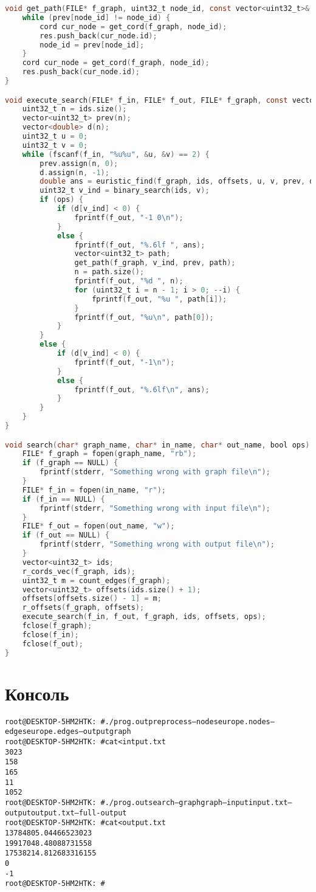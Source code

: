 \begin{lstlisting}[language=C]
void get_path(FILE* f_graph, uint32_t node_id, const vector<uint32_t>& prev, vector<uint32_t>& res) {
    while (prev[node_id] != node_id) {
        cord cur_node = get_cord(f_graph, node_id);
        res.push_back(cur_node.id);
        node_id = prev[node_id];
    }
    cord cur_node = get_cord(f_graph, node_id);
    res.push_back(cur_node.id);
}

void execute_search(FILE* f_in, FILE* f_out, FILE* f_graph, const vector<uint32_t>& ids, const vector<uint32_t>& offsets, bool ops) {
    uint32_t n = ids.size();
    vector<uint32_t> prev(n);
    vector<double> d(n);
    uint32_t u = 0;
    uint32_t v = 0;
    while (fscanf(f_in, "%u%u", &u, &v) == 2) {
        prev.assign(n, 0);
        d.assign(n, -1);
        double ans = euristic_find(f_graph, ids, offsets, u, v, prev, d);
        uint32_t v_ind = binary_search(ids, v);
        if (ops) {
            if (d[v_ind] < 0) {
                fprintf(f_out, "-1 0\n");
            }
            else {
                fprintf(f_out, "%.6lf ", ans);
                vector<uint32_t> path;
                get_path(f_graph, v_ind, prev, path);
                n = path.size();
                fprintf(f_out, "%d ", n);
                for (uint32_t i = n - 1; i > 0; --i) {
                    fprintf(f_out, "%u ", path[i]);
                }
                fprintf(f_out, "%u\n", path[0]);
            }
        }
        else {
            if (d[v_ind] < 0) {
                fprintf(f_out, "-1\n");
            }
            else {
                fprintf(f_out, "%.6lf\n", ans);
            }
        }
    }
}

void search(char* graph_name, char* in_name, char* out_name, bool ops) {
    FILE* f_graph = fopen(graph_name, "rb");
    if (f_graph == NULL) {
        fprintf(stderr, "Something wrong with graph file\n");
    }
    FILE* f_in = fopen(in_name, "r");
    if (f_in == NULL) {
        fprintf(stderr, "Something wrong with input file\n");
    }
    FILE* f_out = fopen(out_name, "w");
    if (f_out == NULL) {
        fprintf(stderr, "Something wrong with output file\n");
    }
    vector<uint32_t> ids;
    r_cords_vec(f_graph, ids);
    uint32_t m = count_edges(f_graph);
    vector<uint32_t> offsets(ids.size() + 1);
    offsets[offsets.size() - 1] = m;
    r_offsets(f_graph, offsets);
    execute_search(f_in, f_out, f_graph, ids, offsets, ops);
    fclose(f_graph);
    fclose(f_in);
    fclose(f_out);
}
\end{lstlisting}

\section{Консоль}
\begin{alltt}
root@DESKTOP-5HM2HTK:~# ./prog.out preprocess --nodes europe.nodes --edges europe.edges --output graph
root@DESKTOP-5HM2HTK:~# cat <intput.txt
30 23
15 8
16 5
1 1
10 52
root@DESKTOP-5HM2HTK:~# ./prog.out search --graph graph --input input.txt --output output.txt --full-output
root@DESKTOP-5HM2HTK:~# cat <output.txt
13784805.044665 2 30 23
19917048.480887 3 15 5 8
17538214.812683 3 16 15 5
0
-1
root@DESKTOP-5HM2HTK:~#
\end{alltt}
\pagebreak

